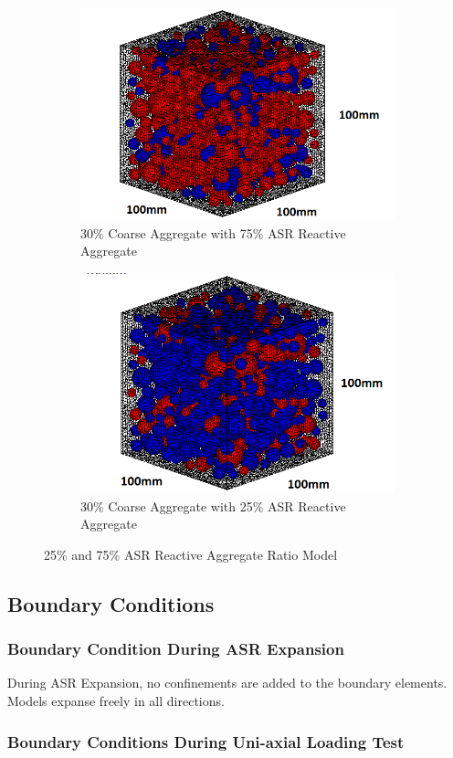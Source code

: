 \begin{figure}[!h]
\centering
\begin{subfigure}{.5\textwidth}
  \centering
  \includegraphics[width=.5\linewidth]{Files/Aggregate/A30P75.png}
  \caption{30\% Coarse Aggregate with 75\% ASR Reactive Aggregate}
\end{subfigure}%
\begin{subfigure}{.5\textwidth}
  \centering
  \includegraphics[width=.5\linewidth]{Files/Aggregate/A30P25.png}
  \caption{30\% Coarse Aggregate with 25\% ASR Reactive Aggregate}
\end{subfigure}
\caption{25\% and 75\% ASR Reactive Aggregate Ratio Model}
\label{fig:Aggregate_Percssssentage}
\end{figure}

\subsection{Boundary Conditions}

\subsubsection{Boundary Condition During ASR Expansion}

During ASR Expansion, no confinements are added to the boundary elements. Models expanse freely in all directions.

\subsubsection{Boundary Conditions During Uni-axial Loading Test}

